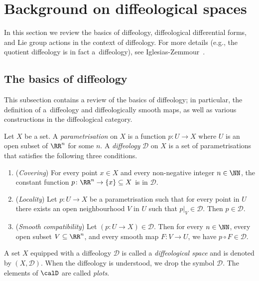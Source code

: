 \section{Background on dif\/feological spaces}\label{sec:diffeology}

In this section we review the basics of dif\/feology, dif\/feological dif\/ferential forms, and Lie group actions in the context of dif\/feology. For more details (e.g., the quotient dif\/feology is in fact a~dif\/feology), see Iglesias-Zemmour~\cite{iglesias}.

\subsection*{The basics of dif\/feology}

This subsection contains a review of the basics of dif\/feology; in particular, the def\/inition of a~dif\/feology and dif\/feologically smooth maps, as well as various constructions in the dif\/feological category.

\begin{Definition}
Let $X$ be a set. A \emph{parametrisation} on $X$ is a
function $p \colon U \to X$ where $U$ is an open subset of $\RR^n$
for some $n$.
A \emph{diffeology} $\mathcal{D}$ on $X$ is a set of parametrisations
that satisf\/ies the following three conditions.

\begin{enumerate}\itemsep=0pt
\item (\emph{Covering})
For every point $x \in X$ and every non-negative integer $n \in \NN$,
the constant function $p \colon \RR^n \to \{ x \} \subseteq X$
is in $\mathcal{D}$.
\item (\emph{Locality})
Let $p \colon U \to X$ be a parametrisation such that
for every point in $U$ there exists an open neighbourhood $V$ in $U$
such that $p|_V \in \mathcal{D}$. Then $p\in\mathcal{D}$.
\item (\emph{Smooth compatibility})
Let $(p \colon U\to X) \in \mathcal{D}$.
Then for every $n \in \NN$, every open subset $V \subseteq \RR^n$,
and every smooth map $F \colon V \to U$, we have $p \circ F \in \mathcal{D}$.
\end{enumerate}

A set $X$ equipped with a dif\/feology $\mathcal{D}$ is called
a \emph{diffeological space} and is denoted by $(X,\mathcal{D})$.
When the dif\/feology is understood, we drop the symbol $\mathcal{D}$.
The elements of $\calD$ are called \emph{plots}.
\end{Definition}

